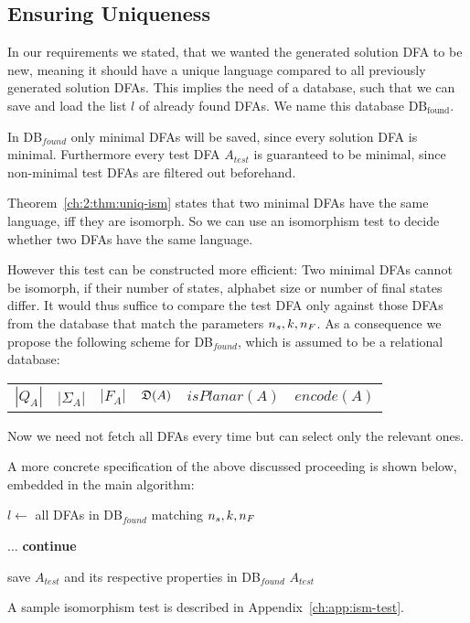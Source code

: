 \subsection{Ensuring Uniqueness}

In our requirements we stated, that we wanted the generated solution DFA to be new, meaning it should have a unique language compared to all previously generated solution DFAs. This implies the need of a database, such that we can save and load the list $l$ of already found DFAs. We name this database $\text{DB}_\text{found}$.

In DB$_{found}$ only minimal DFAs will be saved, since every solution DFA is minimal. Furthermore every test DFA $A_{test}$ is guaranteed to be minimal, since non-minimal test DFAs are filtered out beforehand.

Theorem~\ref{ch:2:thm:uniq-ism} states that two minimal DFAs have the same language, iff they are isomorph. So we can use an isomorphism test to decide whether two DFAs have the same language.

However this test can be constructed more efficient: Two minimal DFAs cannot be isomorph, if their number of states, alphabet size or number of final states differ. It would thus suffice to compare the test DFA only against those DFAs from the database that match the parameters ${n_s}, k, {n_F}$. As a consequence we propose the following scheme for DB$_{found}$, which is assumed to be a relational database:
\begin{center}
	\begin{tabular}{c c c c c c}
	$|Q_A|$ & |$\Sigma_A$| & $|F_A|$ & $\mathfrak{D}(A)$ & $isPlanar(A)$ & $encode(A)$
	\end{tabular}
\end{center}
Now we need not fetch all DFAs every time but can select only the relevant ones.

A more concrete specification of the above discussed proceeding is shown below, embedded in the main algorithm:
\vspace{0.2cm}
\begin{algorithmic}[1]
	
		\vspace{0.2cm}
	
		\State $l \gets$ all DFAs in DB$_{found}$ matching ${n_s}, k, {n_F}$
		
		\vspace{0.2cm}
		
		
		\vspace{0.2cm}
		
			\State $\ldots$
				\State \textbf{continue}
			\EndIf
			
			\vspace{0.2cm}
			
			\State save $A_{test}$ and its respective properties in DB$_{found}$
			\State\Return $A_{test}$
		\EndWhile
	\EndFunction
\end{algorithmic}
\vspace{0.2cm}
A sample isomorphism test is described in Appendix~\ref{ch:app:ism-test}.

